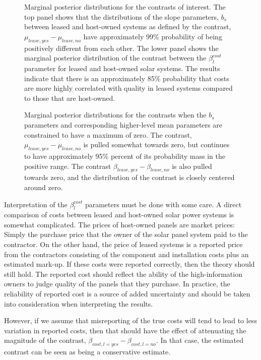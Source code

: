 \documentclass[a4paper]{article}
\begin{document}
\begin{figure}
\begin{minipage}{.48\textwidth}
 \end{minipage}
\bigskip
\begin{minipage}[t]{.48\textwidth}
\centering
\caption{Marginal posterior distributions for the contrasts of interest. The top panel shows that the distributions of the slope parameters, $b_s$ between leased and host-owned systems as defined by the contrast, $\mu_{lease, yes} - \mu_{lease, no}$ have approximately 99\% probability of being positively different from each other. The lower panel shows the marginal posterior distribution of the contrast between the $\beta_l^{cost}$ parameter for leased and host-owned solar systems. The results indicate that there is an approximately 85\% probability that costs are more highly correlated with quality in leased systems compared to those that are host-owned.}
 \label{fig:contrasts}
\end{minipage}\qquad
\begin{minipage}[t]{.48\textwidth}
\centering
 \caption{Marginal posterior distributions for the contrasts when the $b_s$ parameters and corresponding higher-level mean parameters are constrained to have a maximum of zero. The contrast, $\mu_{lease, yes} - \mu_{lease, no}$ is pulled somewhat towards zero, but continues to have approximately 95\% percent of its probability mass in the positive range. The contrast $\beta_{lease, yes} - \beta_{lease, no}$ is also pulled towards zero, and the distribution of the contrast is closely centered around zero.}
 \label{fig:contrasts_const}
\end{minipage}
\end{figure}

Interpretation of the $\beta_l^{cost}$ parameters must be done with some care. A direct comparison of costs between leased and host-owned solar power systems is somewhat complicated. The prices of host-owned panels are market prices: Simply the purchase price that the owner of the solar panel system paid to the contractor. On the other hand, the price of leased systems is a reported price from the contractors consisting of the component and installation costs plus an estimated mark-up. If these costs were reported correctly, then the theory should still hold. The reported cost should reflect the ability of the high-information owners to judge quality of the panels that they purchase. In practice, the reliability of reported cost is a source of added uncertainty and should be taken into consideration when interpreting the results.

However, if we assume that misreporting of the true costs will tend to lead to less variation in reported costs, then that should have the effect of attenuating the magnitude of the contrast, $\beta_{cost, l=yes} - \beta_{cost, l=no}$. In that case, the estimated contrast can be seen as being a conservative estimate.
\end{document}
